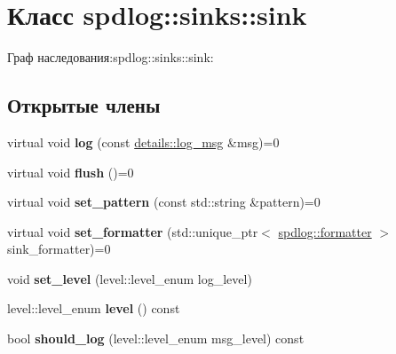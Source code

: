 \hypertarget{classspdlog_1_1sinks_1_1sink}{}\section{Класс spdlog\+:\+:sinks\+:\+:sink}
\label{classspdlog_1_1sinks_1_1sink}


Граф наследования\+:spdlog\+:\+:sinks\+:\+:sink\+:
\subsection*{Открытые члены}
\begin{DoxyCompactItemize}
\item 
\mbox{\label{classspdlog_1_1sinks_1_1sink_a51d8f34ad79064e0dc13c6013236e427}} 
virtual void {\bfseries log} (const \hyperlink{structspdlog_1_1details_1_1log__msg}{details\+::log\+\_\+msg} \&msg)=0
\item 
\mbox{\label{classspdlog_1_1sinks_1_1sink_a8a0674ae3bca8f1617aef820e23a2ccd}} 
virtual void {\bfseries flush} ()=0
\item 
\mbox{\label{classspdlog_1_1sinks_1_1sink_a7e5cfd4b683c8bfa8fbd602d7f409632}} 
virtual void {\bfseries set\+\_\+pattern} (const std\+::string \&pattern)=0
\item 
\mbox{\label{classspdlog_1_1sinks_1_1sink_ac410f2229e583a75337a5fdf45d020be}} 
virtual void {\bfseries set\+\_\+formatter} (std\+::unique\+\_\+ptr$<$ \hyperlink{classspdlog_1_1formatter}{spdlog\+::formatter} $>$ sink\+\_\+formatter)=0
\item 
\mbox{\label{classspdlog_1_1sinks_1_1sink_a862aa1ac5ed27de35f1bd3b1aaeb7dc1}} 
void {\bfseries set\+\_\+level} (level\+::level\+\_\+enum log\+\_\+level)
\item 
\mbox{\label{classspdlog_1_1sinks_1_1sink_a8b9693e7ea883ce02234bed0e3b3348d}} 
level\+::level\+\_\+enum {\bfseries level} () const
\item 
\mbox{\label{classspdlog_1_1sinks_1_1sink_a9e6824420e6352e0f5cbb436a0b5d0a4}} 
bool {\bfseries should\+\_\+log} (level\+::level\+\_\+enum msg\+\_\+level) const
\end{DoxyCompactItemize}
